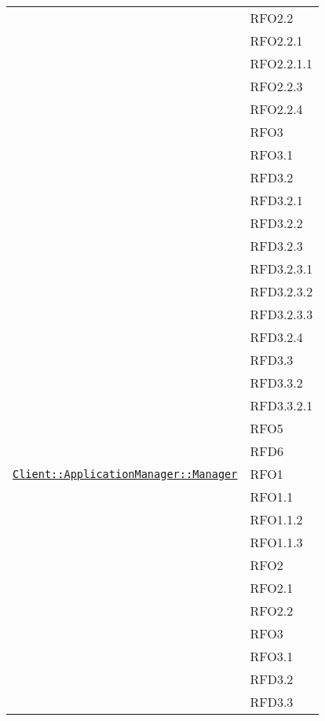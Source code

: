 \begin{longtable}{|>{\centering}m{10cm}|m{3cm}<{\centering}|}
& RFO2.2\\
& RFO2.2.1\\
& RFO2.2.1.1\\
& RFO2.2.3\\
& RFO2.2.4\\
& RFO3\\
& RFO3.1\\
& RFD3.2\\
& RFD3.2.1\\
& RFD3.2.2\\
& RFD3.2.3\\
& RFD3.2.3.1\\
& RFD3.2.3.2\\
& RFD3.2.3.3\\
& RFD3.2.4\\
& RFD3.3\\
& RFD3.3.2\\
& RFD3.3.2.1\\
& RFO5\\
& RFD6\\ \hline

\hyperref[Client::ApplicationManager::Manager]{\texttt{Client::ApplicationManager::Manager}} & RFO1\\
& RFO1.1\\
& RFO1.1.2\\
& RFO1.1.3\\
& RFO2\\
& RFO2.1\\
& RFO2.2\\
& RFO3\\
& RFO3.1\\
& RFD3.2\\
& RFD3.3\\ \hline


\end{longtable}
